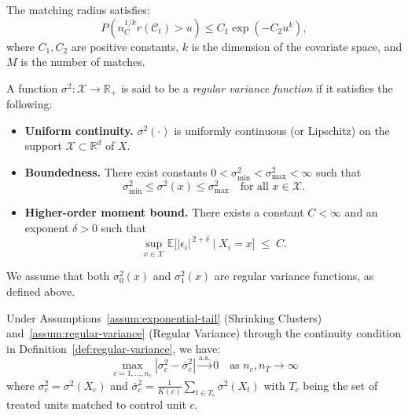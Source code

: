 \documentclass[10pt,a4paper]{amsart}
\begin{document}
\begin{assumption}
\label{assum:exponential-tail}
The matching radius satisfies:
\[
P\left(n_C^{1/k}r\left(\mathcal{C}_t\right) > u\right) \leq C_1  \exp\left(-C_2 u^k\right),
\]
where $C_1, C_2$ are positive constants, $k$ is the dimension of the covariate space, and $M$ is the number of matches.
\end{assumption}

\begin{definition}
\label{def:regular-variance}
A function $\sigma^2 : \mathcal{X} \to \mathbb{R}_{+}$ is said to be a \textit{regular variance function} if it satisfies the following:

\begin{itemize}
    \item \textbf{Uniform continuity.} $\sigma^2(\cdot)$ is uniformly continuous (or Lipschitz) on the support $\mathcal{X} \subset \mathbb{R}^d$ of $X$.

    \item \textbf{Boundedness.} There exist constants $0 < \sigma^2_{\min} < \sigma^2_{\max} < \infty$ such that
    \[
    \sigma^2_{\min} \leq \sigma^2(x) \leq \sigma^2_{\max} \quad \text{for all } x \in \mathcal{X}.
    \]

    \item \textbf{Higher-order moment bound.} There exists a constant $C < \infty$ and an exponent $\delta > 0$ such that 
    \[
    \sup_{x \in \mathcal{X}}
    \mathbb{E}\bigl[\bigl|\epsilon_i\bigr|^{\,2+\delta} 
      \;\big|\; X_i = x
    \bigr] 
    \;\le\; C.
    \]
\end{itemize}
\end{definition}

\begin{assumption}
\label{assum:regular-variance}
We assume that both $\sigma_0^2(x)$ and $\sigma_1^2(x)$ are regular variance functions, as defined above.
\end{assumption}

\begin{lemma}
\label{lemma:uniform-variance-convergence}
Under Assumptions~\ref{assum:exponential-tail} (Shrinking Clusters) and~\ref{assum:regular-variance} (Regular Variance) through the continuity condition in Definition~\ref{def:regular-variance}, we have:
\begin{equation}
\max_{c=1,\ldots,n_c}|\sigma_c^2 - \bar{\sigma}_c^2| \xrightarrow{\text{a.s.}} 0 \quad \text{as } n_c, n_T \to \infty
\end{equation}
where $\sigma_c^2 = \sigma^2(X_c)$ and $\bar{\sigma}_c^2 = \frac{1}{K(c)}\sum_{t \in T_c}\sigma^2(X_t)$ with $T_c$ being the set of treated units matched to control unit $c$.
\end{lemma}
\end{document}
